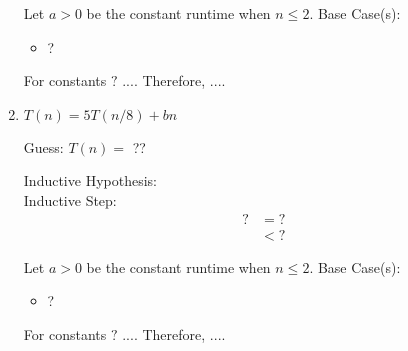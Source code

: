 \documentclass[11pt, letter]{article}
\begin{document}
\begin{enumerate}
    Let $a > 0$ be the constant runtime when $n\leq 2$. Base Case(s):
    \begin{itemize}
        \item ?
    \end{itemize}  
    
    For constants $?$ $...$. Therefore, $...$.\\
    
\item $T(n) = 5T(n/8) + bn$\\

    \begin{center}
        Guess: $T(n) = $ ??\\
    \end{center}
    
    Inductive Hypothesis: \\
    Inductive Step:\\
    \begin{equation*}
        \begin{split}
            ? &= ?\\
            &< ?
        \end{split}
    \end{equation*}
    
    Let $a > 0$ be the constant runtime when $n\leq 2$. Base Case(s):
    \begin{itemize}
        \item ?
    \end{itemize}  
    
    For constants $?$ $...$. Therefore, $...$.\\
    
\end{enumerate}
\end{document}
